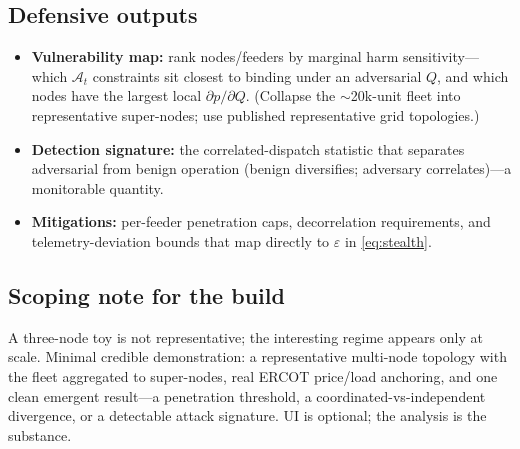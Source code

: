 \documentclass[11pt]{article}
\begin{document}
\subsection{Defensive outputs}
\begin{itemize}
\item \textbf{Vulnerability map:} rank nodes/feeders by marginal harm
sensitivity---which $\mathcal A_t$ constraints sit closest to binding under an
adversarial $Q$, and which nodes have the largest local $\partial p/\partial
Q$. (Collapse the $\sim$20k-unit fleet into representative super-nodes; use
published representative grid topologies.)
\item \textbf{Detection signature:} the correlated-dispatch statistic that
separates adversarial from benign operation (benign diversifies; adversary
correlates)---a monitorable quantity.
\item \textbf{Mitigations:} per-feeder penetration caps, decorrelation
requirements, and telemetry-deviation bounds that map directly to
$\varepsilon$ in \eqref{eq:stealth}.
\end{itemize}

\subsection{Scoping note for the build}
A three-node toy is not representative; the interesting regime appears only at
scale. Minimal credible demonstration: a representative multi-node topology
with the fleet aggregated to super-nodes, real ERCOT price/load anchoring, and
one clean emergent result---a penetration threshold, a coordinated-vs-independent
divergence, or a detectable attack signature. UI is optional; the analysis is
the substance.
\end{document}
